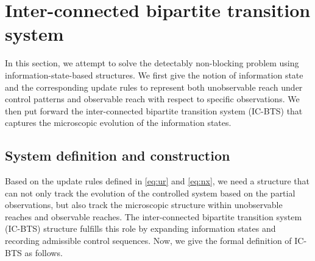 \documentclass[twocolumn]{autart}
\begin{document}
\section{Inter-connected bipartite transition system}\label{sec:bcc}

In this section, we attempt to solve the detectably non-blocking problem using information-state-based structures.
%
We first give the notion of information state and the corresponding update rules to represent both unobservable reach under control patterns and observable reach with respect to specific observations.
%
We then put forward the inter-connected bipartite transition system (IC-BTS) that captures the microscopic evolution of the information states.


\subsection{System definition and construction}


Based on the update rules defined in \eqref{eq:ur} and \eqref{eq:nx}, we need a structure that can not only track the evolution of the controlled system based on the partial observations, but also track the microscopic structure within unobservable reaches and observable reaches.
%
The inter-connected bipartite transition system (IC-BTS) structure fulfills this role by expanding information states and recording admissible control sequences.
Now, we give the formal definition of IC-BTS as follows.
%
\end{document}
